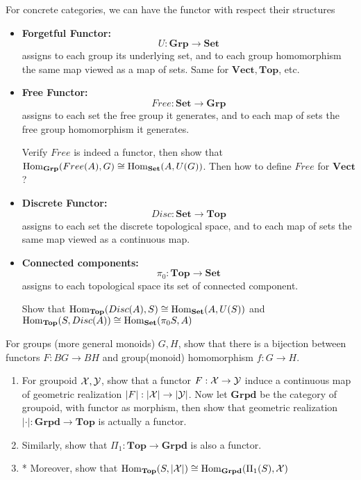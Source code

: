 \begin{example}
  For concrete categories, we can have the functor with respect their structures
 \begin{itemize}

    \item \textbf{Forgetful Functor:} 
    \[
    U: \mathbf{Grp} \to \mathbf{Set}
    \]
    assigns to each group its underlying set, and to each group homomorphism the same map viewed as a map of sets. Same for $\mathbf{Vect},\mathbf{Top}$, etc.
  \item \textbf{Free Functor:} 
    \[
    Free: \mathbf{Set} \to \mathbf{Grp}
    \]
    assigns to each set the free group it generates, and to each map of sets the free group homomorphism it generates.

    \begin{exercise}
      Verify $Free$ is indeed a functor, then show that \\ 
      $\mathrm{Hom}_{\mathbf{Grp}}(Free(A),G)\cong \mathrm{Hom}_{\mathbf{Set}}(A,U(G))$. Then how to define $Free$ for $\mathbf{Vect}$?
    \end{exercise}
  \item \textbf{Discrete Functor:}
    \[
    Disc: \mathbf{Set} \to \mathbf{Top}
    \]
    assigns to each set the discrete topological space, and to each map of sets the same map viewed as a continuous map.
  \item \textbf{Connected components:}
    \[
    \pi_0: \mathbf{Top} \to \mathbf{Set}
    \]
    assigns to each topological space its set of connected component.
    \begin{exercise}
     Show that $\mathrm{Hom}_{\mathbf{Top}}(Disc(A),S)\cong \mathrm{Hom}_{\mathbf{Set}}(A,U(S))$ and \\
     $\mathrm{Hom}_{\mathbf{Top}}(S, Disc(A))\cong \mathrm{Hom}_{\mathbf{Set}}(\pi_0S,A)$
    \end{exercise}
 \end{itemize} 

\end{example}

\begin{exercise}
 For groups (more general monoids) $G,H$, show that there is a bijection between functors $F:BG\to BH$ and group(monoid) homomorphism $f:G\to H$.    
\end{exercise}

\begin{exercise}
  \begin{enumerate}
    \item For groupoid $\mathcal{X},\mathcal{Y}$, show that a functor $F: \mathcal{X} \to \mathcal{Y}$ induce a continuous map of geometric realization $|F|:|\mathcal{X}| \to |\mathcal{Y}|$. Now let $\mathbf{Grpd}$ be  the category of groupoid, with functor as morphism, then show that geometric realization $|\cdot|: \mathbf{Grpd}\to \mathbf{Top}$ is actually a functor. 
    \item Similarly, show that $\Pi_1: \mathbf{Top}\to \mathbf{Grpd}$ is also a functor.
    \item* Moreover, show that $ \mathrm{Hom}_{\mathbf{Top}}(S, |\mathcal{X}|)\cong \mathrm{Hom}_{\mathbf{Grpd}}(\Pi_1(S),\mathcal{X})$
  \end{enumerate}
   
\end{exercise}

